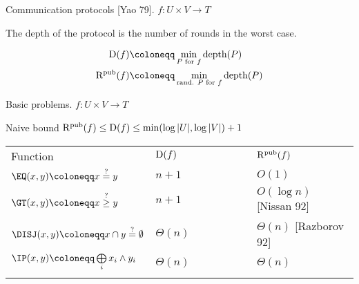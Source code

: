 \begin{frame}{Communication protocols [Yao 79]. $f: U \times V \to T$}
    \begin{center}
    	    
    \end{center}

    \pause
    \pause
    \pause
	\pause
    
    The depth of the protocol is the number of rounds in the worst case.
    
    \pause
    \begin{center}
        \begin{align*}
          \DCC(f) & \coloneqq \min\limits_{P \text{ for } f} \text{depth}(P) \\
          \RCC(f) & \coloneqq \min\limits_{\text{rand. } P \text{ for } f} \text{depth}(P)
        \end{align*}
    \end{center}
\end{frame}

\begin{frame}{Basic problems. $f: U \times V \to T$}

    \begin{block}{Naive bound}
        $\mathrm{R}^{\text{pub}}(f) \le \mathrm{D}(f) \le \min(\log |U|, \log |V|) + 1$
    \end{block}

    \pause      
    \begin{tabular}{b{0.4\linewidth}b{0.3\linewidth}b{0.3\linewidth}}
      Function & $\mathrm{D}(f)$ & $\mathrm{R}^{\text{pub}}(f)$ \\
      \vspace{0.1cm}
      \pause      
      $\EQ(x, y) \coloneqq x \overset{?}{=} y$ & $n + 1$ & $O(1)$ \\
      \vspace{0.1cm}
      \pause
      $\GT(x, y) \coloneqq x \overset{?}{\ge} y$ & $n + 1$ & $O(\log n)$ [Nissan 92] \\
      \vspace{0.1cm}
      \pause
      $\DISJ(x, y) \coloneqq x \cap y \overset{?}{=} \emptyset$ & $\Theta(n)$ &
                                                                                $\Theta(n)$ [Razborov 92] \\
            \pause
      $\IP(x, y) \coloneqq  \bigoplus\limits_i x_i \land y_i$ & $\Theta(n)$ & $\Theta(n)$ \\
      \vspace{0.1cm}
    \end{tabular}
\end{frame}

